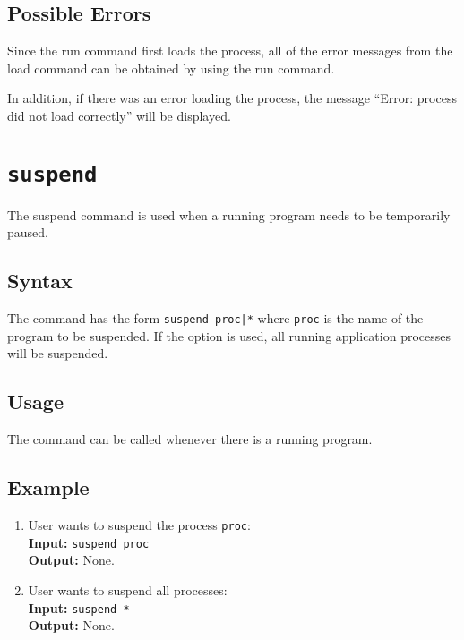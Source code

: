 \subsection{Possible Errors}

Since the run command first loads the process, all of the error messages from the load
command can be obtained by using the run command.

In addition, if there was an error loading the process, the message ``Error: process did
not load correctly'' will be displayed.







\section{\tt suspend}
\label{suspend_cmd}

The suspend command is used when a running program needs to be temporarily paused.

\subsection{Syntax}

The command has the form {\tt suspend proc|*} where {\tt proc} is the name of the program
to be suspended. If the {\tt *} option is used, all running application processes will be 
suspended.

\subsection{Usage}
The command can be called whenever there is a running program.

\subsection{Example}
\begin{enumerate}
    \item User wants to suspend the process {\tt proc}: \\
        {\bf Input:} {\tt suspend proc} \\
        {\bf Output:} None.
    \item User wants to suspend all processes: \\
        {\bf Input:} {\tt suspend *} \\
        {\bf Output:} None.
\end{enumerate}
